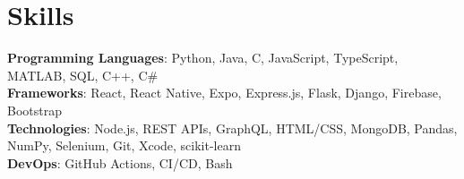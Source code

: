 

\section*{Skills}
	\textbf{Programming Languages}{: Python, Java, C, JavaScript, TypeScript, MATLAB, SQL, C++, C\#} \\
	\textbf{Frameworks}{: React, React Native, Expo, Express.js, Flask, Django, Firebase, Bootstrap} \\
	\textbf{Technologies}{: Node.js, REST APIs, GraphQL,  HTML/CSS, MongoDB, Pandas, NumPy, Selenium, Git, Xcode, scikit-learn} \\
	\textbf{DevOps}{: GitHub Actions, CI/CD, Bash} \\
\vspace{-6.5pt}